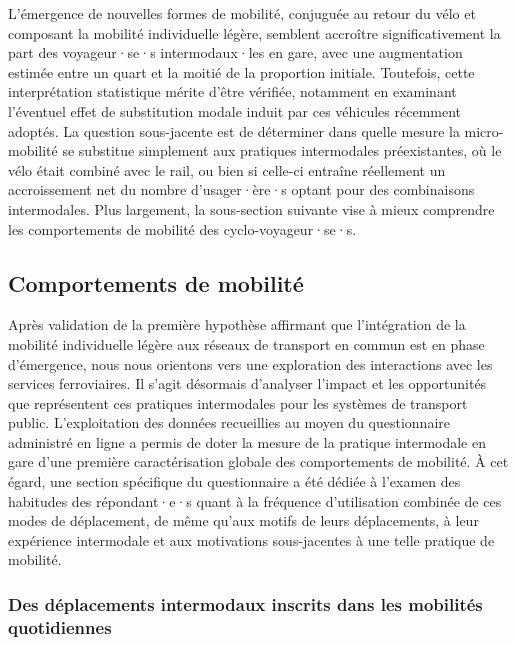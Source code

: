 \begin{refsegment}
L'émergence de nouvelles formes de mobilité, conjuguée au retour du vélo et composant la mobilité individuelle légère, semblent accroître significativement la part des voyageur·se·s intermodaux·les en gare, avec une augmentation estimée entre un quart et la moitié de la proportion initiale. Toutefois, cette interprétation statistique mérite d'être vérifiée, notamment en examinant l'éventuel effet de substitution modale induit par ces véhicules récemment adoptés. La question sous-jacente est de déterminer dans quelle mesure la micro-mobilité se substitue simplement aux pratiques intermodales préexistantes, où le vélo était combiné avec le rail, ou bien si celle-ci entraîne réellement un accroissement net du nombre d'usager·ère·s optant pour des combinaisons intermodales. Plus largement, la sous-section suivante vise à mieux comprendre les comportements de mobilité des cyclo-voyageur·se·s.%

\subsection{Comportements de mobilité
    \label{chap4:comportements-mobilite}
    }

Après validation de la première hypothèse affirmant que l’intégration de la mobilité individuelle légère aux réseaux de transport en commun est en phase d'émergence, nous nous orientons vers une exploration des interactions avec les services ferroviaires. Il s’agit désormais d’analyser l’impact et les opportunités que représentent ces pratiques intermodales pour les systèmes de transport public. L'exploitation des données recueillies au moyen du questionnaire administré en ligne a permis de doter la mesure de la pratique intermodale en gare d'une première caractérisation globale des comportements de mobilité. À cet égard, une section spécifique du questionnaire a été dédiée à l'examen des habitudes des répondant·e·s quant à la fréquence d'utilisation combinée de ces modes de déplacement, de même qu'aux motifs de leurs déplacements, à leur expérience intermodale et aux motivations sous-jacentes à une telle pratique de mobilité.%

\subsubsection*{Des déplacements intermodaux inscrits dans les mobilités quotidiennes
    \label{chap4:frequence-motif-experience}
    }


\end{refsegment}
